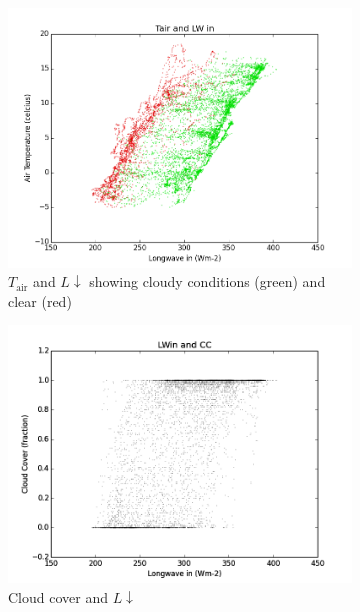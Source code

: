 \documentclass[a4paper,titlepage, twoside]{report}
\newcommand\Ldown{L\!\!\downarrow}
\begin{document}
\begin{figure}
\begin{subfigure}{0.48\textwidth}
\includegraphics[width=\textwidth]{003_LW_Tair_cloud.png}
\caption{$T_\mathrm{air}$ and $\Ldown$ showing cloudy conditions (green) and clear (red)}
\end{subfigure}
\hfill
\begin{subfigure}{0.48\textwidth}
\includegraphics[width=\textwidth]{004_LWin_CC.png}
\caption{Cloud cover and $\Ldown$}
\end{subfigure}
\\
\begin{subfigure}{0.48\textwidth}

\end{subfigure}
\end{figure}
\end{document}
